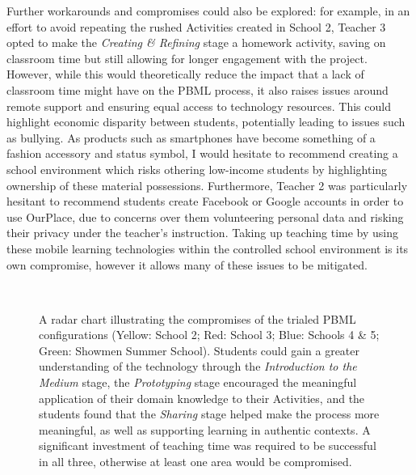 Further workarounds and compromises could also be explored: for example, in an effort to avoid repeating the rushed Activities created in School 2, Teacher 3 opted to make the \textit{Creating \& Refining} stage a homework activity, saving on classroom time but still allowing for longer engagement with the project. However, while this would theoretically reduce the impact that a lack of classroom time might have on the PBML process, it also raises issues around remote support and ensuring equal access to technology resources. This could highlight economic disparity between students, potentially leading to issues such as bullying. As products such as smartphones have become something of a fashion accessory and status symbol, I would hesitate to recommend creating a school environment which risks othering low-income students by highlighting ownership of these material possessions. Furthermore, Teacher 2 was particularly hesitant to recommend students create Facebook or Google accounts in order to use OurPlace, due to concerns over them volunteering personal data and risking their privacy under the teacher's instruction. Taking up teaching time by using these mobile learning technologies within the controlled school environment is its own compromise, however it allows many of these issues to be mitigated.

\begin{figure}
\centering
  \caption[A radar chart illustrating the compromises of the different PBML configurations.]{A radar chart illustrating the compromises of the trialed PBML configurations (Yellow: School 2; Red: School 3; Blue: Schools 4 \& 5; Green: Showmen Summer School). Students could gain a greater understanding of the technology through the \textit{Introduction to the Medium} stage, the \textit{Prototyping} stage encouraged the meaningful application of their domain knowledge to their Activities, and the students found that the \textit{Sharing} stage helped make the process more meaningful, as well as supporting learning in authentic contexts. A significant investment of teaching time was required to be successful in all three, otherwise at least one area would be compromised. }~\label{fig:PBMLradar}
\end{figure}

